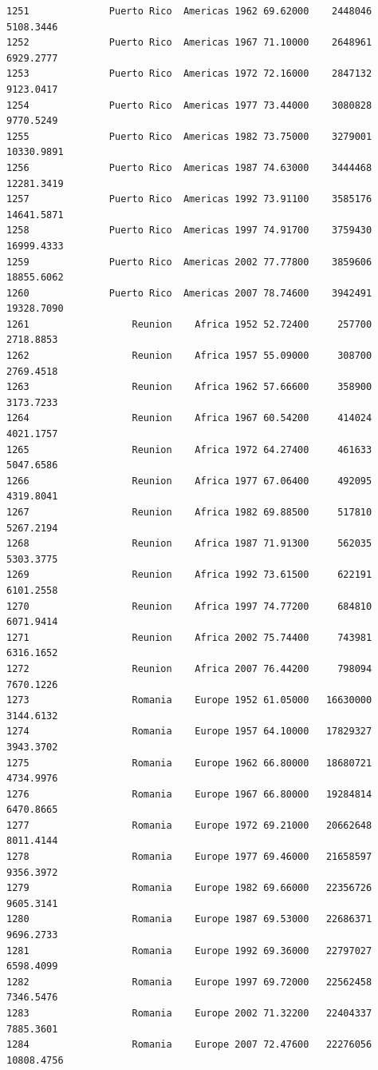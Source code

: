 \documentclass[
  letterpaper,
  DIV=11,
  numbers=noendperiod]{scrreprt}
\begin{document}
\begin{verbatim}
1251              Puerto Rico  Americas 1962 69.62000    2448046   5108.3446
1252              Puerto Rico  Americas 1967 71.10000    2648961   6929.2777
1253              Puerto Rico  Americas 1972 72.16000    2847132   9123.0417
1254              Puerto Rico  Americas 1977 73.44000    3080828   9770.5249
1255              Puerto Rico  Americas 1982 73.75000    3279001  10330.9891
1256              Puerto Rico  Americas 1987 74.63000    3444468  12281.3419
1257              Puerto Rico  Americas 1992 73.91100    3585176  14641.5871
1258              Puerto Rico  Americas 1997 74.91700    3759430  16999.4333
1259              Puerto Rico  Americas 2002 77.77800    3859606  18855.6062
1260              Puerto Rico  Americas 2007 78.74600    3942491  19328.7090
1261                  Reunion    Africa 1952 52.72400     257700   2718.8853
1262                  Reunion    Africa 1957 55.09000     308700   2769.4518
1263                  Reunion    Africa 1962 57.66600     358900   3173.7233
1264                  Reunion    Africa 1967 60.54200     414024   4021.1757
1265                  Reunion    Africa 1972 64.27400     461633   5047.6586
1266                  Reunion    Africa 1977 67.06400     492095   4319.8041
1267                  Reunion    Africa 1982 69.88500     517810   5267.2194
1268                  Reunion    Africa 1987 71.91300     562035   5303.3775
1269                  Reunion    Africa 1992 73.61500     622191   6101.2558
1270                  Reunion    Africa 1997 74.77200     684810   6071.9414
1271                  Reunion    Africa 2002 75.74400     743981   6316.1652
1272                  Reunion    Africa 2007 76.44200     798094   7670.1226
1273                  Romania    Europe 1952 61.05000   16630000   3144.6132
1274                  Romania    Europe 1957 64.10000   17829327   3943.3702
1275                  Romania    Europe 1962 66.80000   18680721   4734.9976
1276                  Romania    Europe 1967 66.80000   19284814   6470.8665
1277                  Romania    Europe 1972 69.21000   20662648   8011.4144
1278                  Romania    Europe 1977 69.46000   21658597   9356.3972
1279                  Romania    Europe 1982 69.66000   22356726   9605.3141
1280                  Romania    Europe 1987 69.53000   22686371   9696.2733
1281                  Romania    Europe 1992 69.36000   22797027   6598.4099
1282                  Romania    Europe 1997 69.72000   22562458   7346.5476
1283                  Romania    Europe 2002 71.32200   22404337   7885.3601
1284                  Romania    Europe 2007 72.47600   22276056  10808.4756

\end{verbatim}
\end{document}
